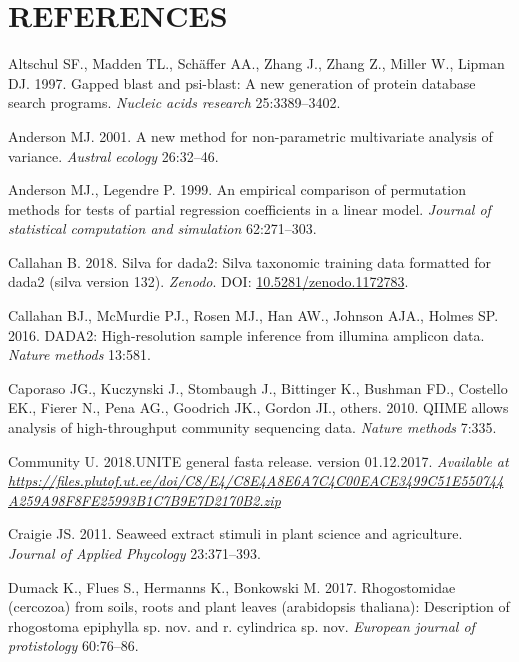 \documentclass[11pt,]{article}
\begin{document}
\newpage  

\section*{REFERENCES}\label{references}

\hypertarget{refs}{}
\hypertarget{ref-altschul1997gapped}{}
Altschul SF., Madden TL., Schäffer AA., Zhang J., Zhang Z., Miller W.,
Lipman DJ. 1997. Gapped blast and psi-blast: A new generation of protein
database search programs. \emph{Nucleic acids research} 25:3389--3402.

\hypertarget{ref-anderson2001new}{}
Anderson MJ. 2001. A new method for non-parametric multivariate analysis
of variance. \emph{Austral ecology} 26:32--46.

\hypertarget{ref-anderson1999empirical}{}
Anderson MJ., Legendre P. 1999. An empirical comparison of permutation
methods for tests of partial regression coefficients in a linear model.
\emph{Journal of statistical computation and simulation} 62:271--303.

\hypertarget{ref-silva}{}
Callahan B. 2018. Silva for dada2: Silva taxonomic training data
formatted for dada2 (silva version 132). \emph{Zenodo}. DOI:
\href{https://doi.org/10.5281/zenodo.1172783}{10.5281/zenodo.1172783}.

\hypertarget{ref-callahan2016dada2}{}
Callahan BJ., McMurdie PJ., Rosen MJ., Han AW., Johnson AJA., Holmes SP.
2016. DADA2: High-resolution sample inference from illumina amplicon
data. \emph{Nature methods} 13:581.

\hypertarget{ref-caporaso2010qiime}{}
Caporaso JG., Kuczynski J., Stombaugh J., Bittinger K., Bushman FD.,
Costello EK., Fierer N., Pena AG., Goodrich JK., Gordon JI., others.
2010. QIIME allows analysis of high-throughput community sequencing
data. \emph{Nature methods} 7:335.

\hypertarget{ref-UNITE2017}{}
Community U. 2018.UNITE general fasta release. version 01.12.2017.
\emph{Available at}
\emph{\url{https://files.plutof.ut.ee/doi/C8/E4/C8E4A8E6A7C4C00EACE3499C51E550744A259A98F8FE25993B1C7B9E7D2170B2.zip}}

\hypertarget{ref-craigie2011seaweed}{}
Craigie JS. 2011. Seaweed extract stimuli in plant science and
agriculture. \emph{Journal of Applied Phycology} 23:371--393.

\hypertarget{ref-dumack2017rhogostomidae}{}
Dumack K., Flues S., Hermanns K., Bonkowski M. 2017. Rhogostomidae
(cercozoa) from soils, roots and plant leaves (arabidopsis thaliana):
Description of rhogostoma epiphylla sp. nov. and r. cylindrica sp. nov.
\emph{European journal of protistology} 60:76--86.
\end{document}
